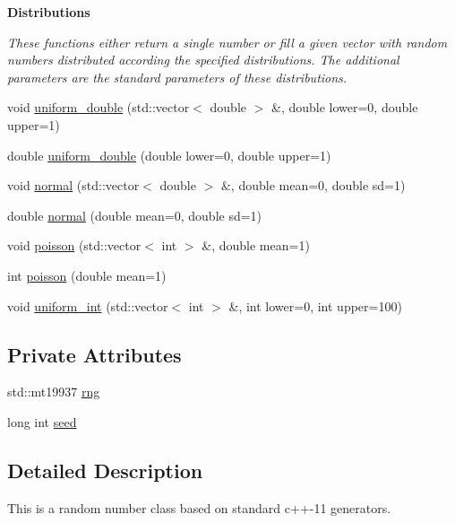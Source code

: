 \begin{Indent}\textbf{ Distributions}\par
{\em These functions either return a single number or fill a given vector with random numbers distributed according the specified distributions. The additional parameters are the standard parameters of these distributions. }\begin{DoxyCompactItemize}
\item 
void \mbox{\hyperlink{classRandomNumbers_ae226c129494f9055ac37ed1af943d010}{uniform\+\_\+double}} (std\+::vector$<$ double $>$ \&, double lower=0, double upper=1)
\item 
double \mbox{\hyperlink{classRandomNumbers_a1e66bf9926ad3916f3804dd20ea393f1}{uniform\+\_\+double}} (double lower=0, double upper=1)
\item 
void \mbox{\hyperlink{classRandomNumbers_a4ef5917200da65aa267735d389bdf995}{normal}} (std\+::vector$<$ double $>$ \&, double mean=0, double sd=1)
\item 
double \mbox{\hyperlink{classRandomNumbers_abbfcbae72e7dbd048567dd5b8e2ce9d2}{normal}} (double mean=0, double sd=1)
\item 
void \mbox{\hyperlink{classRandomNumbers_a69e33058b8a923f9597cf13421d5fcd4}{poisson}} (std\+::vector$<$ int $>$ \&, double mean=1)
\item 
int \mbox{\hyperlink{classRandomNumbers_ac5bd95dddabde62a74a0d871a66ce2f0}{poisson}} (double mean=1)
\item 
void \mbox{\hyperlink{classRandomNumbers_a905a78d8d1dbb9b5b98472cc42b94a98}{uniform\+\_\+int}} (std\+::vector$<$ int $>$ \&, int lower=0, int upper=100)
\end{DoxyCompactItemize}
\end{Indent}
\subsection*{Private Attributes}
\begin{DoxyCompactItemize}
\item 
std\+::mt19937 \mbox{\hyperlink{classRandomNumbers_a15ceee85d6d00de12ae76c90aaec2f14}{rng}}
\item 
long int \mbox{\hyperlink{classRandomNumbers_a83c563bc5ca60f2e5c149244b327d948}{seed}}
\end{DoxyCompactItemize}


\subsection{Detailed Description}
This is a random number class based on standard c++-\/11 generators. 

